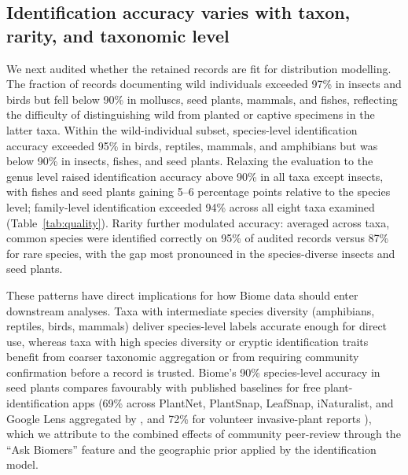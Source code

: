 \documentclass[11pt]{article}
\begin{document}
\subsection{Identification accuracy varies with taxon, rarity, and taxonomic level}

We next audited whether the retained records are fit for distribution modelling. The fraction of records documenting wild individuals exceeded 97\% in insects and birds but fell below 90\% in molluscs, seed plants, mammals, and fishes, reflecting the difficulty of distinguishing wild from planted or captive specimens in the latter taxa. Within the wild-individual subset, species-level identification accuracy exceeded 95\% in birds, reptiles, mammals, and amphibians but was below 90\% in insects, fishes, and seed plants. Relaxing the evaluation to the genus level raised identification accuracy above 90\% in all taxa except insects, with fishes and seed plants gaining 5--6 percentage points relative to the species level; family-level identification exceeded 94\% across all eight taxa examined (Table~\ref{tab:quality}). Rarity further modulated accuracy: averaged across taxa, common species were identified correctly on 95\% of audited records versus 87\% for rare species, with the gap most pronounced in the species-diverse insects and seed plants.

These patterns have direct implications for how Biome data should enter downstream analyses. Taxa with intermediate species diversity (amphibians, reptiles, birds, mammals) deliver species-level labels accurate enough for direct use, whereas taxa with high species diversity or cryptic identification traits benefit from coarser taxonomic aggregation or from requiring community confirmation before a record is trusted. Biome's 90\% species-level accuracy in seed plants compares favourably with published baselines for free plant-identification apps (69\% across PlantNet, PlantSnap, LeafSnap, iNaturalist, and Google Lens aggregated by \citet{hart2023plantapps}, and 72\% for volunteer invasive-plant reports \citep{crall2011assessing}), which we attribute to the combined effects of community peer-review through the ``Ask Biomers'' feature and the geographic prior applied by the identification model.
\end{document}

